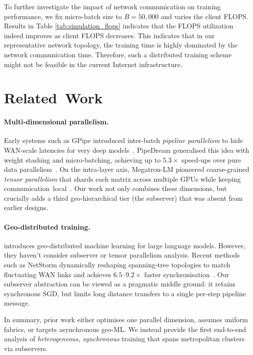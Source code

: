 \documentclass{article}
\begin{document}
To further investigate the impact of network communication on training performance, we fix micro-batch size to $B = 50,000$ and varies the client FLOPS. Results in Table \ref{tab:simulation_flops} indicates that the FLOPS utilization indeed improves as client FLOPS decreases. This indicates that in our representative network topology, the training time is highly dominated by the network communication time. Therefore, such a distributed training scheme might not be feasible in the current Internet infrastructure.


\section{Related Work}\label{sec:related}

\paragraph{Multi‑dimensional parallelism.}
Early systems such as GPipe introduced inter‑batch \emph{pipeline parallelism} to hide WAN‑scale latencies for very deep models~\cite{huang2019gpipe}.  
PipeDream generalised this idea with weight stashing and micro‑batching, achieving up to $5.3\times$ speed‑ups over pure data parallelism \cite{narayanan2019pipedream}. 
On the intra‑layer axis, Megatron‑LM pioneered coarse‐grained \emph{tensor parallelism} that shards each matrix across multiple GPUs while keeping communication local \cite{shoeybi2019megatron}.  
Our work not only combines these dimensions, but crucially adds a third geo‑hierarchical tier (the subserver) that was absent from earlier designs.

\paragraph{Geo‑distributed training.}

\cite{yuan2022decentralized} introduces geo-distributed machine learning for large language models. However, they haven't consider subserver or tensor parallelism analysis. Recent methods such as NetStorm dynamically reshaping spanning‑tree topologies to match fluctuating WAN links and achieves $6.5$–$9.2\times$ faster synchronisation \cite{li2024accelerating}.  
Our subserver abstraction can be viewed as a pragmatic middle ground: it retains synchronous SGD, but limits long distance transfers to a single per‑step pipeline message.


\smallskip
In summary, prior work either optimises one parallel dimension, assumes uniform fabrics, or targets asynchronous geo‑ML.  
We instead provide the first end‑to‑end analysis of \emph{heterogeneous, synchronous} training that spans metropolitan clusters via subservers.
\end{document}

